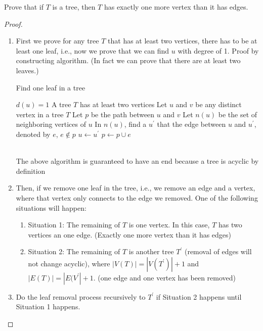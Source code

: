 			\begin{problem}
				Prove that if $T$ is a tree, then $T$ has exactly one more vertex than it has edges.
			\end{problem}

			\begin{proof}
				\begin{enumerate}
					\item First we prove for any tree $T$ that has at least two vertices, there has to be at least one leaf, i.e., now we prove that we can find $u$ with degree of 1. Proof by constructing algorithm. (In fact we can prove that there are at least two leaves.)\\
						\begin{algorithm}[!ht]
							\caption{Find one leaf in a tree}
							\begin{algorithmic}[1]
								\REQUIRE $d(u)=1$
								\ENSURE A tree $T$ has at least two vertices
								\STATE Let $u$ and $v$ be any distinct vertex in a tree $T$
								\STATE Let $p$ be the path between $u$ and $v$
										\STATE Let $n(u)$ be the set of neighboring vertices of $u$
										\STATE In $n(u)$, find a $u^\prime$ that the edge between $u$ and $u^\prime$, denoted by $e$, $e \notin p$
										\STATE $u \gets u^\prime$
										\STATE $p \gets p \cup e$
									\ENDIF
								\ENDWHILE
							\end{algorithmic}
						\end{algorithm}\\
						The above algorithm is guaranteed to have an end because a tree is acyclic by definition
					\item Then, if we remove one leaf in the tree, i.e., we remove an edge and a vertex, where that vertex only connects to the edge we removed. One of the following situations will happen:
					\begin{enumerate}
						\item Situation 1: The remaining of $T$ is one vertex. In this case, $T$ has two vertices an one edge. (Exactly one more vertex than it has edges)
						\item Situation 2: The remaining of $T$ is another tree $T^{'}$ (removal of edges will not change acyclic), where $|V(T)| = |V(T^{'})| + 1$ and $|E(T)| = |E(V^{'}| + 1$. (one edge and one vertex has been removed)
					\end{enumerate}
					\item Do the leaf removal process recursively to $T^{'}$ if Situation 2 happens until Situation 1 happens. 
				\end{enumerate}
			\end{proof}

